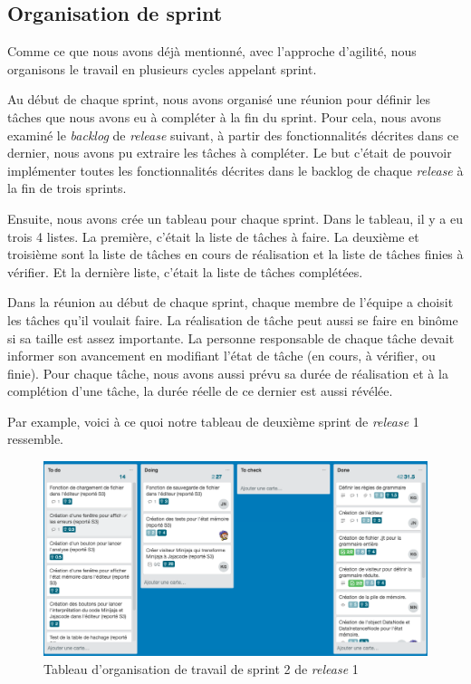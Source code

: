 \documentclass[a4paper,12pt]{article}
\begin{document}
\subsection{Organisation de sprint}
Comme ce que nous avons déjà mentionné, avec l'approche d'agilité, nous organisons le travail en plusieurs cycles appelant sprint. 

Au début de chaque sprint, nous avons organisé une réunion pour définir les tâches que nous avons eu à compléter à la fin du sprint. Pour cela, nous avons examiné le \textit{backlog} de \textit{release} suivant, à partir des fonctionnalités décrites dans ce dernier, nous avons pu extraire les tâches à compléter. Le but c'était de pouvoir implémenter toutes les fonctionnalités décrites dans le backlog de chaque \textit{release} à la fin de trois sprints.

Ensuite, nous avons crée un tableau pour chaque sprint. Dans le tableau, il y a eu trois 4 listes. La première, c'était la liste de tâches à faire. La deuxième et troisième sont la liste de tâches en cours de réalisation et la liste de tâches finies à vérifier. Et la dernière liste, c'était la liste de tâches complétées.

Dans la réunion au début de chaque sprint, chaque membre de l'équipe a choisit les tâches qu'il voulait faire. La réalisation de tâche peut aussi se faire en binôme si sa taille est assez importante. La personne responsable de chaque tâche devait informer son avancement en modifiant l'état de tâche (en cours, à vérifier, ou finie). Pour chaque tâche, nous avons aussi prévu sa durée de réalisation et à la complétion d'une tâche, la durée réelle de ce dernier est aussi révélée.

Par example, voici à ce quoi notre tableau de deuxième sprint de \textit{release} 1 ressemble.

\begin{figure}[H]
\begin{center}
	\includegraphics[scale=0.3]{sprint2}
	\caption{Tableau d'organisation de travail de sprint 2 de \textit{release} 1}
\end{center}
\end{figure}
\end{document}
